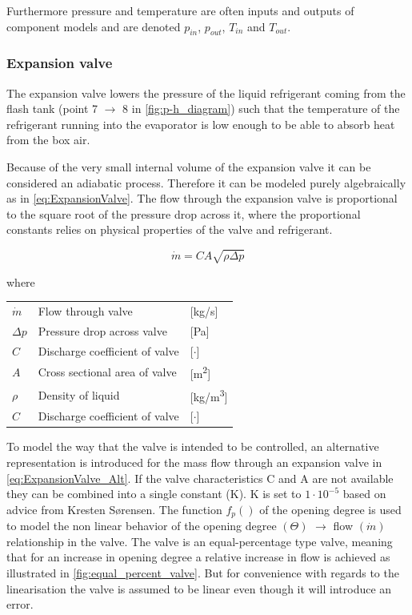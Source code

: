 Furthermore pressure and temperature are often inputs and outputs of component models and are denoted $p_{in}$, $p_{out}$, $T_{in}$ and $T_{out}$.

\subsubsection{Expansion valve}\label{sec:componentModel_Val}
The expansion valve lowers the pressure of the liquid refrigerant coming from the flash tank (point 7 $\rightarrow$ 8 in \cref{fig:p-h_diagram}) such that the temperature of the refrigerant running into the evaporator is low enough to be able to absorb heat from the box air.

Because of the very small internal volume of the expansion valve it can be considered an adiabatic process. Therefore it can be modeled purely algebraically as in \cref{eq:ExpansionValve}. The flow through the expansion valve is proportional to the square root of the pressure drop across it, where the proportional constants relies on physical properties of the valve and refrigerant.

\begin{equation} \label{eq:ExpansionValve}
	\dot{m}= C A \sqrt{\rho\Delta p}
\end{equation}

where
\begin{center}
	\begin{tabular}{l p{6cm} l}
		$\dot{m}$ 	& Flow through valve & [\si{kg}/\si{s}]\\
		$\Delta p$ 	& Pressure drop across valve & [\si{Pa}]\\
		$C$ 		& Discharge coefficient of valve & [$\cdot$]\\
		$A$	 		& Cross sectional area of valve & [\si{m^2}]\\
		$\rho$ 		& Density of liquid & [\si{kg}/\si{m^3}]\\
			$C$ 	& Discharge coefficient of valve & [$\cdot$]\\
	\end{tabular}
\end{center}

To model the way that the valve is intended to be controlled, an alternative representation is introduced for the mass flow through an expansion valve in \cref{eq:ExpansionValve_Alt}. If the valve characteristics C and A are not available they can be combined into a single constant (K). K is set to $1 \cdot 10^{-5}$ based on advice from Kresten Sørensen. The function $f_p()$ of the opening degree is used to model the non linear behavior of the opening degree $( \Theta )$ $\rightarrow$ flow $( \dot{m} )$ relationship in the valve. The valve is an equal-percentage type valve, meaning that for an increase in opening degree a relative increase in flow is achieved as illustrated in \cref{fig:equal_percent_valve}. But for convenience with regards to the linearisation the valve is assumed to be linear even though it will introduce an error.


